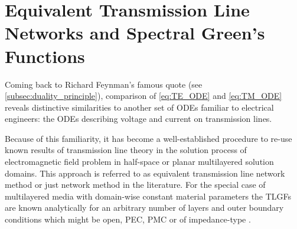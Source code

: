 \section{Equivalent Transmission Line Networks and Spectral Green's Functions}
\label{sec:tl_greens_functions}

Coming back to Richard Feynman's famous quote (see
\cref{subsec:duality_principle}), comparison of \eqref{eq:TE_ODE} and
\eqref{eq:TM_ODE} reveals distinctive similarities to another set of
\acp{ODE} familiar to electrical engineers: the \acp{ODE} describing 
voltage and current on transmission lines. 

Because of this familiarity, it has become a well-established procedure to
re-use known results of transmission line theory in the solution process of
electromagnetic field problem in half-space or planar multilayered solution
domains.
This approach is referred to as equivalent transmission line network method or
just network method in the literature.
For the special case of multilayered media with domain-wise constant material
parameters the \acp{TLGF} are known analytically for an arbitrary number of
layers and outer boundary conditions which might be open, \ac{PEC}, \ac{PMC}
or of impedance-type \cite[Section~2.4]{Felsen1994}\cite{Michalski1990,
Eibert1997,Michalski2005,Michalski2016b}.

